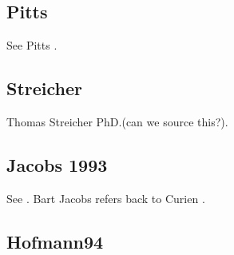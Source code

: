 \documentclass[14pt,a4paper]{scrartcl}
\begin{document}
\subsection{Pitts}
See Pitts \cite{pitts2000}.

\subsection{Streicher}
Thomas Streicher PhD.(can we source this?).

\subsection{Jacobs 1993}
See \cite{jacobs93}.
Bart Jacobs refers back to Curien \cite{curien89}.

\subsection {Hofmann94}
\end{document}
